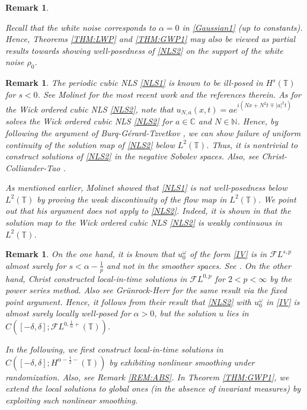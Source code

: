 \documentclass[11pt]{amsart}
\newtheorem{remark}[theorem]{Remark}
\numberwithin{equation}{section} \numberwithin{theorem}{section}
\begin{document}
\begin{remark} \label{REM:white}
\rm

Recall that the white noise corresponds to ${\alpha} = 0$ in \eqref{Gaussian1} (up to constants).
Hence,  Theorems \ref{THM:LWP} and \ref{THM:GWP1} may also be viewed as partial results towards showing 
well-posedness of \eqref{NLS2} on the support of the white noise $ \rho_0$. 
\end{remark}

\begin{remark}
	\rm The periodic cubic NLS \eqref{NLS1} is known to be ill-posed in $H^s(\mathbb{T})$ for $s < 0$. See Molinet \cite{Molinet:2009p365} for the most recent work and the references therein. 
	As for the Wick ordered cubic NLS \eqref{NLS2}, note that $ u_{N, a}(x, t) = a e^{i(Nx + N^2 t \mp |a|^2t)}$ solves the Wick ordered cubic NLS \eqref{NLS2} for $a \in \mathbb{C}$ and $N \in \mathbb{N}$. Hence, by following the argument of Burq-G\'erard-Tzvetkov \cite{Burq:2002p911}, we can show failure of uniform continuity of the solution map of \eqref{NLS2} below $L^2(\mathbb{T})$. Thus, it is nontrivial to construct solutions of \eqref{NLS2} in the negative Sobolev spaces.
Also, see Christ-Colliander-Tao \cite{Christ:2003p838}. 	
	
As mentioned earlier, Molinet \cite{Molinet:2009p365} showed that \eqref{NLS1} is not well-posedness below $L^2(\mathbb{T})$ by proving the weak discontinuity of the flow map in $L^2({\mathbb{T}})$. We point out that his argument does not apply to \eqref{NLS2}. 
Indeed, it is shown in \cite{SULEM} that the solution map to the Wick ordered cubic NLS \eqref{NLS2} is
weakly continuous in $L^2({\mathbb{T}})$.
\end{remark}

\begin{remark}
	\label{REM:FLP} \rm
	On the one hand, it is known that $u_0^\omega$ of the form \eqref{IV} is in $\mathcal{F}L^{s, p}$ almost surely for $ s < {\alpha} - \frac{1}{p}$ and not in the smoother spaces. See \cite{Oh:2009p792, Benyi:2010p842}. On the other hand, Christ \cite{Christ:2007p1011} constructed local-in-time solutions in $\mathcal{F} L^{0,p}$ for $2< p < \infty$ by the power series method. Also see Gr\"unrock-Herr \cite{Grunrock:2008p659} for the same result via the fixed point argument. Hence, it follows from their result that \eqref{NLS2} with $u_0^\omega$ in \eqref{IV} is almost surely locally well-posed for ${\alpha} > 0$, but the solution $u$ lies in $C([-{\delta}, {\delta}]; \mathcal{F} L^{0,\frac{1}{\alpha}+}({\mathbb{T}}))$. 
	
	In the following, 
	we first construct local-in-time solutions in $C([-{\delta}, {\delta}];H^{{\alpha} - \frac{1}{2}-}(\mathbb{T}))$ by exhibiting nonlinear smoothing under randomization. Also, see Remark \ref{REM:ABS}.
	In Theorem \ref{THM:GWP1},  we extend the local solutions to global ones (in the absence of invariant measures) by exploiting such nonlinear smoothing. 
\end{remark}
\end{document}
